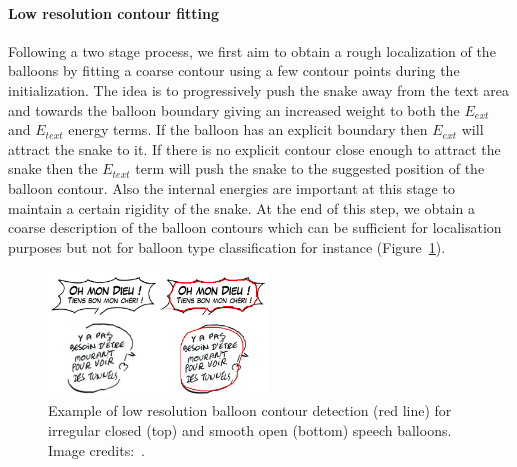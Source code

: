 
\paragraph{Low resolution contour fitting}
Following a two stage process, we first aim to obtain a rough localization of the balloons by fitting a coarse contour using a few contour points during the initialization.
The idea is to progressively push the snake away from the text area and towards the balloon boundary giving an increased weight to both the $E_{ext}$ and $E_{text}$ energy terms.
If the balloon has an explicit boundary then $E_{ext}$ will attract the snake to it.
If there is no explicit contour close enough to attract the snake then the $E_{text}$ term will push the snake to the suggested position of the balloon contour.
Also the internal energies are important at this stage to maintain a certain rigidity of the snake.
At the end of this step, we obtain a coarse description of the balloon contours which can be sufficient for localisation purposes but not for balloon type classification for instance (Figure~\ref{fig:se:mono_res_det}). 

	\begin{figure}[!ht]	%
	  \centering
		\includegraphics[trim = 0mm 3mm 0mm 1mm, clip, width=220px]{mono_res_det.png}
		\caption[Examples of low resolution contour detection for balloon extraction]{Example of low resolution balloon contour detection (red line) for irregular closed (top) and smooth open (bottom) speech balloons. Image credits:~\cite{EtPisTaf12,Montaine11}.}
		\label{fig:se:mono_res_det}
	\end{figure}

